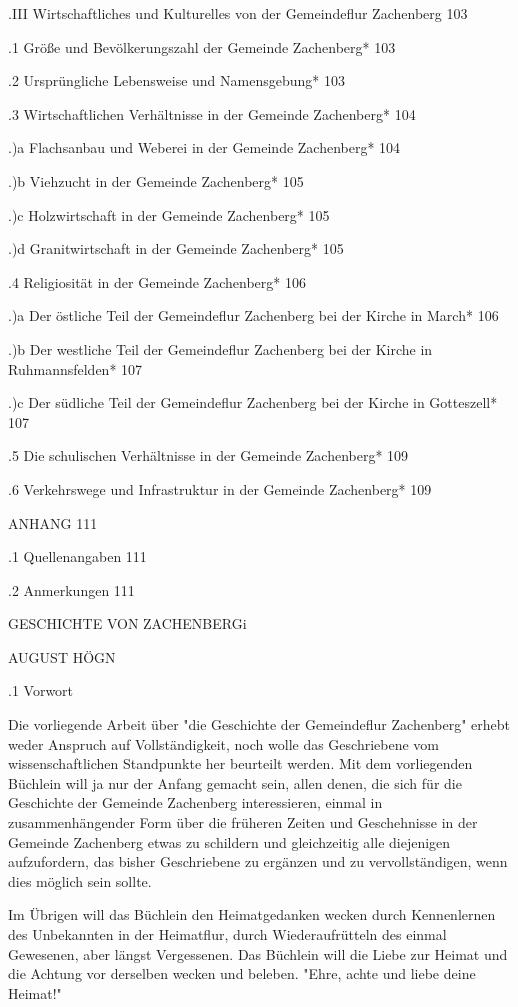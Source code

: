 .III Wirtschaftliches und Kulturelles von der Gemeindeflur Zachenberg   103

.1 Größe und Bevölkerungszahl der Gemeinde Zachenberg*  103

.2 Ursprüngliche Lebensweise und Namensgebung*  103

.3 Wirtschaftlichen Verhältnisse in der Gemeinde Zachenberg*    104

.)a Flachsanbau und Weberei in der Gemeinde Zachenberg* 104

.)b Viehzucht in der Gemeinde Zachenberg*   105

.)c Holzwirtschaft in der Gemeinde Zachenberg*  105

.)d Granitwirtschaft in der Gemeinde Zachenberg*    105

.4 Religiosität in der Gemeinde Zachenberg* 106

.)a Der östliche Teil der Gemeindeflur Zachenberg bei der Kirche in March*  106

.)b Der westliche Teil der Gemeindeflur Zachenberg bei der Kirche in
Ruhmannsfelden*    107

.)c Der südliche Teil der Gemeindeflur Zachenberg bei der Kirche in Gotteszell*
107

.5 Die schulischen Verhältnisse in der Gemeinde Zachenberg* 109

.6 Verkehrswege und Infrastruktur in der Gemeinde Zachenberg*   109

ANHANG  111

.1 Quellenangaben   111

.2 Anmerkungen  111



 

GESCHICHTE VON ZACHENBERGi

AUGUST HÖGN

.1 Vorwort

Die vorliegende Arbeit über "die Geschichte der Gemeindeflur Zachenberg" erhebt
weder Anspruch auf Vollständigkeit, noch wolle das Geschriebene vom
wissenschaftlichen Standpunkte her beurteilt werden. Mit dem vorliegenden
Büchlein will ja nur der Anfang gemacht sein, allen denen, die sich für die
Geschichte der Gemeinde Zachenberg interessieren, einmal in zusammenhängender
Form über die früheren Zeiten und Geschehnisse in der Gemeinde Zachenberg etwas
zu schildern und gleichzeitig alle diejenigen aufzufordern, das bisher
Geschriebene zu ergänzen und zu vervollständigen, wenn dies möglich sein sollte.

Im Übrigen will das Büchlein den Heimatgedanken wecken durch Kennenlernen des
Unbekannten in der Heimatflur, durch Wiederaufrütteln des einmal Gewesenen, aber
längst Vergessenen. Das Büchlein will die Liebe zur Heimat und die Achtung vor
derselben wecken und beleben. "Ehre, achte und liebe deine Heimat!"

